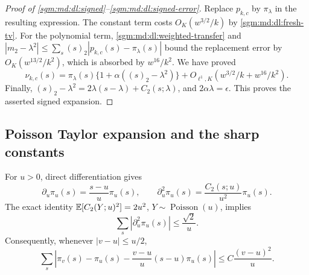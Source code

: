 \documentclass[11pt,letterpaper]{article}
\theoremstyle{remark}\newtheorem{remark}[theorem]{Remark}
\newcommand{\Poi}{\operatorname{Poisson}}\newcommand{\Bin}{\operatorname{Bin}}
\newcommand{\fall}[2]{(#1)_{#2}}\newcommand{\rise}[2]{#1^{\overline{#2}}}
\theoremstyle{definition}\newtheorem{definition}[theorem]{Definition}
\begin{document}
\begin{proof}[Proof of \eqref{sgm:md:dl:signed}--\eqref{sgm:md:dl:signed-error}]
Replace $p_{k,c}$ by $\pi_\lambda$ in the resulting expression.
The constant term costs $O_K(w^{3/2}/k)$ by
\eqref{sgm:md:dl:fresh-tv}.  For the polynomial term,
\eqref{sgm:md:dl:weighted-transfer} and
$|m_2-\lambda^2|\le\sum_s\fall{s}{2}|p_{k,c}(s)-\pi_\lambda(s)|$
bound the replacement error by $O_K(w^{13/2}/k^2)$, which is absorbed
by $w^{16}/k^2$.  We have proved
\begin{equation}\label{sgm:md:dl:falling-signed}
 \nu_{k,c}(s)=\pi_\lambda(s)
     \{1+\alpha(\fall{s}{2}-\lambda^2)\}
       +O_{\ell^1,K}\!\left(w^{3/2}/k+w^{16}/k^2\right).
\end{equation}
Finally,
$\fall{s}{2}-\lambda^2=2\lambda(s-\lambda)+C_2(s;\lambda)$,
and $2\alpha\lambda=\epsilon$.
This proves the asserted signed expansion.
\end{proof}

\subsection{Poisson Taylor expansion and the sharp constants}

For $u>0$, direct differentiation gives
\begin{equation}\label{sgm:md:dl:poisson-derivatives}
 \partial_u\pi_u(s)=\frac{s-u}{u}\pi_u(s),\qquad
 \partial_u^2\pi_u(s)=\frac{C_2(s;u)}{u^2}\pi_u(s).
\end{equation}
The exact identity
$\mathbb E[C_2(Y;u)^2]=2u^2$, $Y\sim\Poi(u)$, implies
\begin{equation}\label{sgm:md:dl:poisson-second}
 \sum_s|\partial_u^2\pi_u(s)|\le\frac{\sqrt2}{u}.
\end{equation}
Consequently, whenever $|v-u|\le u/2$,
\begin{equation}\label{sgm:md:dl:poisson-taylor}
 \sum_s\left|\pi_v(s)-\pi_u(s)
       -\frac{v-u}{u}(s-u)\pi_u(s)\right|
                      \le C\frac{(v-u)^2}{u}.
\end{equation}
\end{document}
